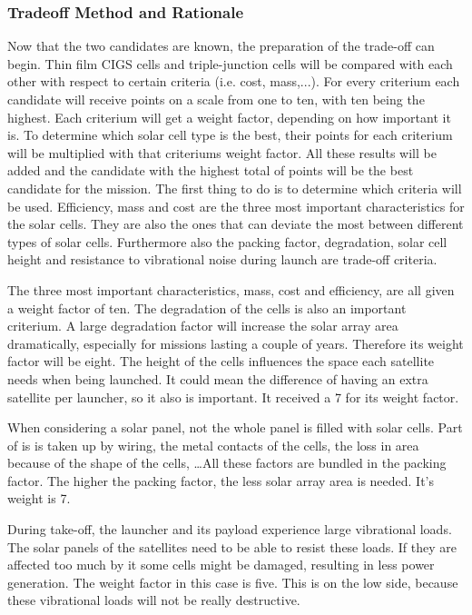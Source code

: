 \subsubsection{Tradeoff Method and Rationale}
\label{TO_weight}
Now that the two candidates are known, the preparation of the trade-off can begin. Thin film \ac{CIGS} cells and triple-junction cells will be compared with each other with respect to certain criteria (i.e. cost, mass,...). For every criterium each candidate will receive points on a scale from one to ten, with ten being the highest. Each criterium will get a weight factor, depending on how important it is. To determine which solar cell type is the best, their points for each criterium will be multiplied with that criteriums weight factor. All these results will be added and the candidate with the highest total of points will be the best candidate for the mission. 
The first thing to do is to determine which criteria will be used. Efficiency, mass and cost are the three most important characteristics for the solar cells. They are also the ones that can deviate the most between different types of solar cells. Furthermore also the packing factor, degradation, solar cell height and resistance to vibrational noise during launch are trade-off criteria. 

The three most important characteristics, mass, cost and efficiency, are all given a weight factor of ten. The degradation of the cells is also an important criterium. A large degradation factor will increase the solar array area dramatically, especially for missions lasting a couple of years. Therefore its weight factor will be eight. The height of the cells influences the space each satellite needs when being launched. It could mean the difference of having an extra satellite per launcher, so it also is important. It received a 7 for its weight factor.

When considering a solar panel, not the whole panel is filled with solar cells. Part of is is taken up by wiring, the metal contacts of the cells, the loss in area because of the shape of the cells, \ldots All these factors are bundled in the packing factor. The higher the packing factor, the less solar array area is needed. It's weight is 7.

During take-off, the launcher and its payload experience large vibrational loads. The solar panels of the satellites need to be able to resist these loads. If they are affected too much by it some cells might be damaged, resulting in less power generation. The weight factor in this case is five. This is on the low side, because these vibrational loads will not be really destructive. 

